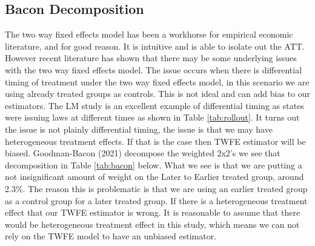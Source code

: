 \documentclass{article}
\begin{document}
\subsection*{Bacon Decomposition}
The two way fixed effects model has been a workhorse for empirical economic literature, and for good reason. It is intuitive and is able to isolate out the ATT. However recent literature has shown that there may be some underlying issues with the two way fixed effects model. The issue occurs when there is differential timing of treatment under the two way fixed effects model, in this scenario we are using already treated groups as controls. This is not ideal and can add bias to our estimators. The LM study is an excellent example of differential timing as states were issuing laws at different times as shown in Table \ref{tab:rollout}. It turns out the issue is not plainly differential timing, the issue is that we may have heterogeneous treatment effects. If that is the case then TWFE estimator will be biased. Goodman-Bacon (2021) decompose the weighted 2x2's we see that decomposition in Table \ref{tab:bacon} below. What we see is that we are putting a not insignificant amount of weight on the Later to Earlier treated group, around 2.3\%. The reason this is problematic is that we are using an earlier treated group as a control group for a later treated group. If there is a heterogeneous treatment effect that our TWFE estimator is wrong. It is reasonable to assume that there would be heterogeneous treatment effect in this study, which means we can not rely on the TWFE model to have an unbiased estimator.
\end{document}
